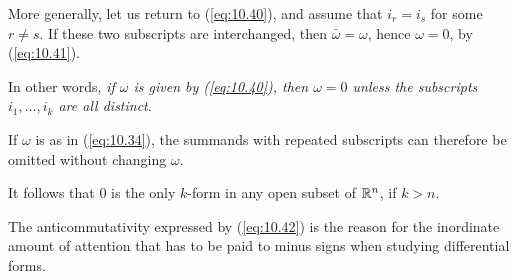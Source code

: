 \begin{myRemark}
    More generally, let us return to (\ref{eq:10.40}),
    and assume that $i_r = i_s$ for some $r \neq s$.
    If these two subscripts are interchanged,
    then $\bar{\omega} = \omega$,
    hence $\omega = 0$, by (\ref{eq:10.41}).

    In other words, \emph{if $\omega$ is given by (\ref{eq:10.40}), 
    then $\omega = 0$ unless the subscripts $i_1,\dots,i_k$ are all distinct}.

    If $\omega$ is as in (\ref{eq:10.34}), the summands with repeated subscripts can therefore be omitted without changing $\omega$.

    It follows that 0 is the only $k$-form in any open subset of ${\protect\mathbb R}^n$, if $k > n$.

    The anticommutativity expressed by (\ref{eq:10.42}) is the reason for the inordinate amount of attention that has to be paid to minus signs when studying differential forms.    
\end{myRemark}


